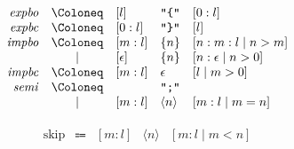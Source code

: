 \begin{align*}
  \begin{array}{rclll}
    \mathit{expbo}
    & \Coloneq & [l] &\text{\texttt{\textquotedbl\{\textquotedbl}} &[0:l] \\
    \mathit{expbc}
    & \Coloneq & [0:l] &\text{\texttt{\textquotedbl\}\textquotedbl}} &[l] \\
    \mathit{impbo}
    & \Coloneq & [m:l] &\{ n\} &[n:m:l \mid n > m] \\
    & \mid & [\epsilon] &\{ n\} &[n:\epsilon \mid n > 0] \\
    \mathit{impbc}
    & \Coloneq & [m:l] &\epsilon &[l \mid m > 0] \\
    \mathit{semi}
    & \Coloneq & &\text{\texttt{\textquotedbl ;\textquotedbl}} \\
    & \mid & [m:l] & \langle n\rangle &[m:l \mid m = n]
  \end{array}
\end{align*}

\begin{align*}
  \begin{array}{rclll}
    \mathrm{skip}
    &\Coloneq & [m:l] &\langle n\rangle &[m:l \mid m < n]
  \end{array}
\end{align*}
